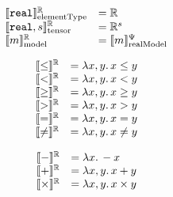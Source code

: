 \begin{equation*}
\begin{array}{ll}
\llbracket \mathtt{real} \rrbracket_\text{elementType}^{\mathbb{R}}
&= \mathbb{R}
\\
\llbracket \mathtt{real}, s \rrbracket_\text{tensor}^{\mathbb{R}}
&= \mathbb{R}^s
\\
\llbracket m \rrbracket_\text{model}^{\mathbb{R}}
&= \llbracket m \rrbracket_\text{realModel}^\Psi
\end{array}
\end{equation*}


\begin{minipage}[t]{0.49\textwidth}
\begin{equation*}
\begin{array}{ll}
\llbracket \leq \rrbracket^{\mathbb{R}} 
&= \lambda x, y .\, x \leq y
\\
\llbracket < \rrbracket^{\mathbb{R}} 
&= \lambda x, y .\, x < y
\\
\llbracket \geq \rrbracket^{\mathbb{R}} 
&= \lambda x, y .\, x \geq y
\\
\llbracket > \rrbracket^{\mathbb{R}} 
&= \lambda x, y .\, x > y
\\
\llbracket = \rrbracket^{\mathbb{R}} 
&= \lambda x, y .\, x = y
\\
\llbracket \neq \rrbracket^{\mathbb{R}} 
&= \lambda x, y .\, x \neq y 
\end{array}
\end{equation*}
\end{minipage}
\hfill
\begin{minipage}[t]{0.49\textwidth}
\begin{equation*}
\begin{array}{ll}
\llbracket - \rrbracket^{\mathbb{R}} 
&= \lambda x .\, - x
\\
\llbracket + \rrbracket^{\mathbb{R}} 
&= \lambda x, y .\, x + y 
\\
\llbracket \times \rrbracket^{\mathbb{R}} 
&= \lambda x, y .\, x \times y 
\end{array}
\end{equation*}
\end{minipage}